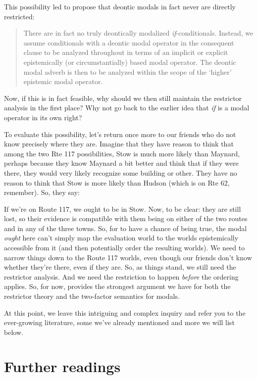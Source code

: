 This possibility led \cite{frank-1996-dissertation} to propose that deontic
modals in fact never are directly restricted:

\begin{quote}
  There are in fact no truly deontically modalized \emph{if}-conditionals.
  Instead, we assume conditionals with a deontic modal operator in the
  consequent clause to be analyzed throughout in terms of an implicit or
  explicit epistemically (or circumstantially) based modal operator. The deontic
  modal adverb is then to be analyzed within the scope of the `higher' epistemic
  modal operator.
\end{quote}

Now, if this is in fact feasible, why should we then still maintain the
restrictor analysis in the first place? Why not go back to the earlier idea that
\emph{if} is a modal operator in its own right? 

%
To evaluate this possibility, let's return once more to our friends who do not
know precisely where they are. Imagine that they have reason to think that among
the two Rte 117 possibilities, Stow is much more likely than Maynard, perhaps
because they know Maynard a bit better and think that if they were there, they
would very likely recognize some building or other. They have no reason to think
that Stow is more likely than Hudson (which is on Rte 62, remember). So, they
say:

\ex If we're on Route 117, we ought to be in Stow. \xe
%
Now, to be clear: they are still lost, so their evidence is compatible with them
being on either of the two routes and in any of the three towns. So, for \Last
to have a chance of being true, the modal \emph{ought} here can't simply map the
evaluation world to the worlds epistemically accessible from it (and then
potentially order the resulting worlds). We need to narrow things down to the
Route 117 worlds, even though our friends don't know whether they're there, even
if they are. So, as things stand, we still need the restrictor analysis. And we
need the restriction to happen \emph{before} the ordering applies. So, for now,
\Last provides the strongest argument we have for both the restrictor theory and
the two-factor semantics for modals.

At this point, we leave this intriguing and complex inquiry and refer you to the
ever-growing literature, some we've already mentioned and more we will list
below. 

\section*{Further readings} 

